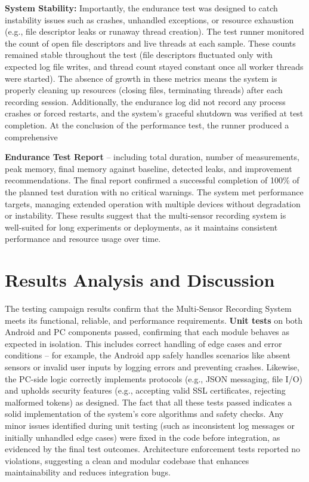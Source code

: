 \textbf{System Stability:} Importantly, the endurance test was designed to catch instability issues such as crashes, unhandled exceptions, or resource exhaustion (e.g., file descriptor leaks or runaway thread creation). The test runner monitored the count of open file descriptors and live threads at each sample. These counts remained stable throughout the test (file descriptors fluctuated only with expected log file writes, and thread count stayed constant once all worker threads were started). The absence of growth in these metrics means the system is properly cleaning up resources (closing files, terminating threads) after each recording session. Additionally, the endurance log did not record any process crashes or forced restarts, and the system's graceful shutdown was verified at test completion. At the conclusion of the performance test, the runner produced a comprehensive

\textbf{Endurance Test Report} -- including total duration, number of measurements, peak memory, final memory against baseline, detected leaks, and improvement recommendations. The final report confirmed a successful completion of 100\% of the planned test duration with no critical warnings. The system met performance targets, managing extended operation with multiple devices without degradation or instability. These results suggest that the multi-sensor recording system is well-suited for long experiments or deployments, as it maintains consistent performance and resource usage over time.


\section{Results Analysis and Discussion}
The testing campaign results confirm that the Multi-Sensor Recording System meets its functional, reliable, and performance requirements. \textbf{Unit tests} on both Android and PC components passed, confirming that each module behaves as expected in isolation. This includes correct handling of edge cases and error conditions -- for example, the Android app safely handles scenarios like absent sensors or invalid user inputs by logging errors and preventing crashes. Likewise, the PC-side logic correctly implements protocols (e.g., JSON messaging, file I/O) and upholds security features (e.g., accepting valid SSL certificates, rejecting malformed tokens) as designed. The fact that all these tests passed indicates a solid implementation of the system's core algorithms and safety checks. Any minor issues identified during unit testing (such as inconsistent log messages or initially unhandled edge cases) were fixed in the code before integration, as evidenced by the final test outcomes. Architecture enforcement tests reported no violations, suggesting a clean and modular codebase that enhances maintainability and reduces integration bugs.

